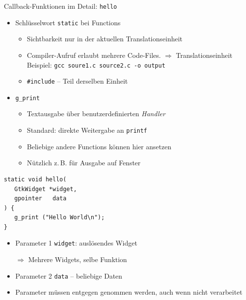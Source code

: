 \begin{frame}[fragile]{Callback-Funktionen im Detail: \texttt{hello}}
%
\begin{minipage}{.5\linewidth}
%
\begin{itemize}
\item Schlüsselwort \texttt{static} bei Functions
	\begin{itemize}
	\item Sichtbarkeit nur in der aktuellen Translationseinheit
	\item Compiler-Aufruf erlaubt mehrere Code-Files. $\Rightarrow$ Translationseinheit\\
		Beispiel: \texttt{gcc soure1.c source2.c -o output}
	\item \texttt{#include} -- Teil derselben Einheit
	\end{itemize}		
\item \texttt{g\_print}
	\begin{itemize}
	\item Textausgabe über benutzerdefinierten \emph{Handler}
	\item Standard: direkte Weitergabe an \texttt{printf}
	\item Beliebige andere Functions können hier ansetzen
	\item Nützlich z.\,B. für Ausgabe auf Fenster
	\end{itemize}
\end{itemize}
\end{minipage}
%
\begin{minipage}{.49\linewidth}
\begin{codebox}
\begin{verbatim}
static void hello(
   GtkWidget *widget,
   gpointer   data
) {
   g_print ("Hello World\n");
}
\end{verbatim}
\end{codebox}
%
\begin{itemize}
\item Parameter 1 \texttt{widget}: auslösendes Widget
\item[$\Rightarrow$] Mehrere Widgets, selbe Funktion
\item Parameter 2 \texttt{data} -- beliebige Daten
\item Parameter müssen entgegen genommen werden, auch wenn nicht verarbeitet
\end{itemize}
\end{minipage}
%
\end{frame}

